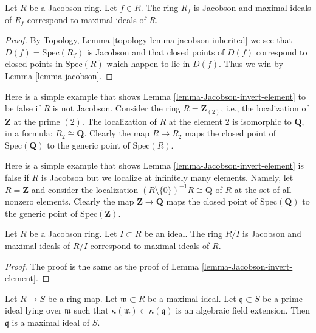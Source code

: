 \begin{lemma}
\label{lemma-Jacobson-invert-element}
Let $R$ be a Jacobson ring. Let $f \in R$.
The ring $R_f$ is Jacobson and maximal ideals
of $R_f$ correspond to maximal ideals of $R$.
\end{lemma}

\begin{proof}
By Topology, Lemma \ref{topology-lemma-jacobson-inherited}
we see that $D(f) = \text{Spec}(R_f)$ is Jacobson and
that closed points of $D(f)$
correspond to closed points in $\text{Spec}(R)$
which happen to lie in $D(f)$. Thus we win by
Lemma \ref{lemma-jacobson}.
\end{proof}

\begin{example}
\label{example-localize-not-preserve-closed-points}
Here is a simple example that shows Lemma \ref{lemma-Jacobson-invert-element}
to be false if $R$ is not Jacobson.
Consider the ring $R = \mathbf{Z}_{(2)}$, i.e., the localization
of $\mathbf{Z}$ at the prime $(2)$. The localization of $R$ at
the element $2$ is isomorphic to $\mathbf{Q}$, in a formula:
$R_2 \cong \mathbf{Q}$. Clearly the map $R \to R_2$ maps the
closed point of $\text{Spec}(\mathbf{Q})$ to the generic point
of $\text{Spec}(R)$.
\end{example}

\begin{example}
\label{example-infinite-localize-not-preserve-closed-points}
Here is a simple example that shows
Lemma \ref{lemma-Jacobson-invert-element}
is false if $R$ is Jacobson but we localize at infinitely
many elements.
Namely, let $R = \mathbf{Z}$ and consider the localization
$(R \setminus \{0\})^{-1}R \cong \mathbf{Q}$
of $R$ at the set of all nonzero elements. 
Clearly the map $\mathbf{Z} \to \mathbf{Q}$ maps the
closed point of $\text{Spec}(\mathbf{Q})$ to the generic point
of $\text{Spec}(\mathbf{Z})$.
\end{example}

\begin{lemma}
\label{lemma-Jacobson-mod-ideal}
Let $R$ be a Jacobson ring. Let $I \subset R$ be an ideal.
The ring $R/I$ is Jacobson and maximal ideals
of $R/I$ correspond to maximal ideals of $R$.
\end{lemma}

\begin{proof}
The proof is the same as the proof of
Lemma \ref{lemma-Jacobson-invert-element}.
\end{proof}

\begin{lemma}
\label{lemma-finite-residue-extension-closed}
Let $R \to S$ be a ring map.
Let $\mathfrak m \subset R$ be a maximal ideal.
Let $\mathfrak q \subset S$ be a prime ideal
lying over $\mathfrak m$ such that $\kappa(\mathfrak m)
\subset \kappa(\mathfrak q)$ is an algebraic field extension.
Then $\mathfrak q$ is a maximal ideal of $S$.
\end{lemma}

